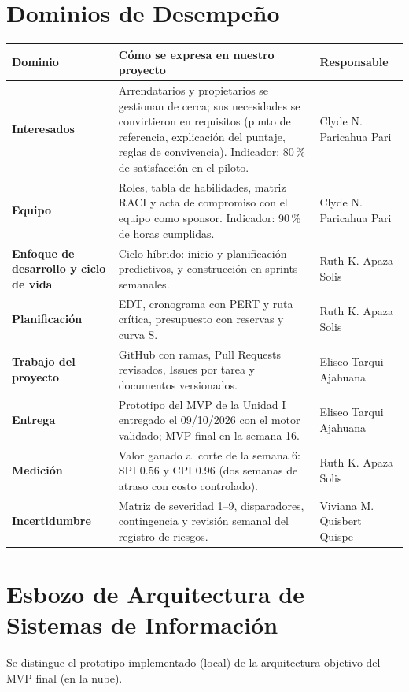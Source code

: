 \documentclass[11pt,a4paper]{article}
\begin{document}
\section{Dominios de Desempeño}
{\small
{}
\noindent\begin{tabularx}{\textwidth}{@{}P{2.85cm} L P{3.0cm}@{}}
\toprule
{}
\textbf{Dominio} & \textbf{Cómo se expresa en nuestro proyecto} & \textbf{Responsable} \\
\midrule
\textbf{Interesados} & Arrendatarios y propietarios se gestionan de cerca; sus necesidades se convirtieron en requisitos (punto de referencia, explicación del puntaje, reglas de convivencia). Indicador: 80\,\% de satisfacción en el piloto. & Clyde N. Paricahua Pari \\
\textbf{Equipo} & Roles, tabla de habilidades, matriz RACI y acta de compromiso con el equipo como sponsor. Indicador: 90\,\% de horas cumplidas. & Clyde N. Paricahua Pari \\
\textbf{Enfoque de desarrollo y ciclo de vida} & Ciclo híbrido: inicio y planificación predictivos, y construcción en sprints semanales. & Ruth K. Apaza Solis \\
\textbf{Planificación} & EDT, cronograma con PERT y ruta crítica, presupuesto con reservas y curva S. & Ruth K. Apaza Solis \\
\textbf{Trabajo del proyecto} & GitHub con ramas, Pull Requests revisados, Issues por tarea y documentos versionados. & Eliseo Tarqui Ajahuana \\
\textbf{Entrega} & Prototipo del MVP de la Unidad I entregado el 09/10/2026 con el motor validado; MVP final en la semana 16. & Eliseo Tarqui Ajahuana \\
\textbf{Medición} & Valor ganado al corte de la semana 6: SPI 0.56 y CPI 0.96 (dos semanas de atraso con costo controlado). & Ruth K. Apaza Solis \\
\textbf{Incertidumbre} & Matriz de severidad 1--9, disparadores, contingencia y revisión semanal del registro de riesgos. & Viviana M. Quisbert Quispe \\
\bottomrule
\end{tabularx}
}

\section{Esbozo de Arquitectura de Sistemas de Información}
Se distingue el prototipo implementado (local) de la arquitectura objetivo del MVP final (en la nube).
\end{document}
